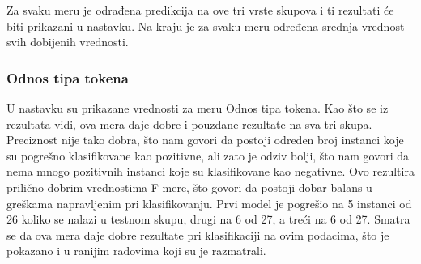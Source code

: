 \documentclass[12pt,oneside]{memoir}
\begin{document}
Za svaku meru je odrađena predikcija na ove tri vrste skupova i ti rezultati će biti prikazani u nastavku. Na kraju je za svaku meru određena srednja vrednost svih dobijenih vrednosti. 

\subsubsection{Odnos tipa tokena}

U nastavku su prikazane vrednosti za meru Odnos tipa tokena.  Kao što se iz rezultata vidi,  ova mera daje dobre i pouzdane rezultate na sva tri skupa.  Preciznost nije tako dobra, što nam govori da postoji određen broj instanci koje su pogrešno klasifikovane kao pozitivne, ali zato je odziv bolji,  što nam govori da nema mnogo pozitivnih instanci koje su klasifikovane kao negativne.  Ovo rezultira prilično dobrim vrednostima F-mere, što govori da postoji dobar balans u greškama napravljenim pri klasifikovanju.  Prvi model je pogrešio na 5 instanci od 26 koliko se nalazi u testnom skupu, drugi na 6 od 27, a treći na 6 od 27.   Smatra se da ova mera daje dobre rezultate pri klasifikaciji na ovim podacima, što je pokazano i u ranijim radovima koji su je razmatrali. 
\newline
\newline
\noindent{}
\end{document}
